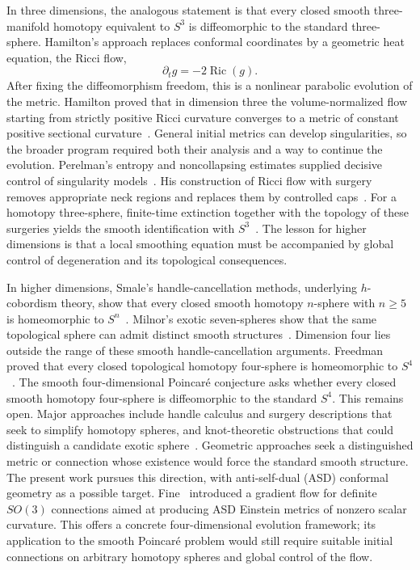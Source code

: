 \documentclass[11pt]{article}
\numberwithin{equation}{section}
\DeclareMathOperator{\Ric}{Ric}
\begin{document}
In three dimensions, the analogous statement is that every closed smooth
three-manifold homotopy equivalent to \(S^3\) is diffeomorphic to the
standard three-sphere. Hamilton's approach replaces conformal coordinates
by a geometric heat equation, the Ricci flow,
\[
 \partial_t g=-2\Ric(g).
\]
After fixing the diffeomorphism freedom, this is a nonlinear parabolic
evolution of the metric. Hamilton proved that in dimension three the
volume-normalized flow starting from strictly positive Ricci curvature
converges to a metric of constant positive sectional
curvature~\cite{Hamilton1982}. General initial metrics can develop
singularities, so the broader program required both their analysis and
a way to continue the evolution. Perelman's entropy and noncollapsing
estimates supplied decisive control of singularity models~\cite{Perelman2002}.
His construction of Ricci flow with surgery removes appropriate neck
regions and replaces them by controlled caps~\cite{Perelman2003Surgery}.
For a homotopy three-sphere, finite-time extinction together with the
topology of these surgeries yields the smooth identification with
\(S^3\)~\cite{Perelman2003Extinction}. The lesson for higher dimensions is
that a local smoothing equation must be accompanied by global control of
degeneration and its topological consequences.

In higher dimensions, Smale's handle-cancellation methods, underlying
$h$-cobordism theory, show that every closed smooth homotopy $n$-sphere
with $n\geq5$ is homeomorphic to $S^n$~\cite{Smale1961}.
Milnor's exotic seven-spheres show that the same topological sphere can
admit distinct smooth structures~\cite{Milnor1956}.
Dimension four lies outside the range of these smooth handle-cancellation
arguments. Freedman proved that every closed topological homotopy
four-sphere is homeomorphic to \(S^4\)~\cite{Freedman1982}. The smooth
four-dimensional Poincar\'e conjecture asks whether every closed smooth
homotopy four-sphere is diffeomorphic to the standard \(S^4\). This remains
open. Major approaches include handle calculus and surgery descriptions
that seek to simplify homotopy
spheres, and knot-theoretic obstructions that could distinguish a candidate
exotic sphere~\cite{FreedmanGompfMorrisonWalker2010}.
Geometric approaches seek a distinguished metric or connection
whose existence would force the standard smooth structure. The present
work pursues this direction, with anti-self-dual (ASD) conformal geometry
as a possible target. Fine~\cite{Fine2011} introduced a gradient flow for
definite \(SO(3)\) connections aimed at producing ASD Einstein metrics of
nonzero scalar curvature. This offers a concrete
four-dimensional evolution framework; its application to the smooth
Poincar\'e problem would still require suitable initial connections on
arbitrary homotopy spheres and global control of the flow.
\end{document}

